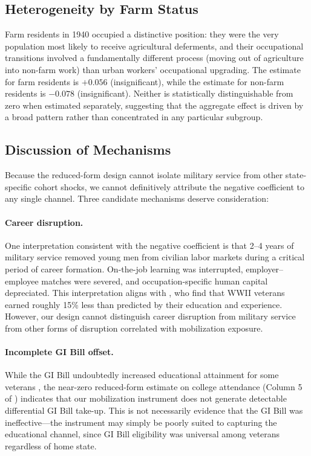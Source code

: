 \documentclass[12pt]{article}
\begin{document}
\subsection{Heterogeneity by Farm Status}

Farm residents in 1940 occupied a distinctive position: they were the very population most likely to receive agricultural deferments, and their occupational transitions involved a fundamentally different process (moving out of agriculture into non-farm work) than urban workers' occupational upgrading. The estimate for farm residents is $+0.056$ (insignificant), while the estimate for non-farm residents is $-0.078$ (insignificant). Neither is statistically distinguishable from zero when estimated separately, suggesting that the aggregate effect is driven by a broad pattern rather than concentrated in any particular subgroup.

\subsection{Discussion of Mechanisms}

Because the reduced-form design cannot isolate military service from other state-specific cohort shocks, we cannot definitively attribute the negative coefficient to any single channel. Three candidate mechanisms deserve consideration:

\paragraph{Career disruption.} One interpretation consistent with the negative coefficient is that 2--4 years of military service removed young men from civilian labor markets during a critical period of career formation. On-the-job learning was interrupted, employer--employee matches were severed, and occupation-specific human capital depreciated. This interpretation aligns with \citet{angristkrueger1994}, who find that WWII veterans earned roughly 15\% less than predicted by their education and experience. However, our design cannot distinguish career disruption from military service from other forms of disruption correlated with mobilization exposure.

\paragraph{Incomplete GI Bill offset.} While the GI Bill undoubtedly increased educational attainment for some veterans \citep{boundturner2002}, the near-zero reduced-form estimate on college attendance (Column 5 of ) indicates that our mobilization instrument does not generate detectable differential GI Bill take-up. This is not necessarily evidence that the GI Bill was ineffective---the instrument may simply be poorly suited to capturing the educational channel, since GI Bill eligibility was universal among veterans regardless of home state.
\end{document}
